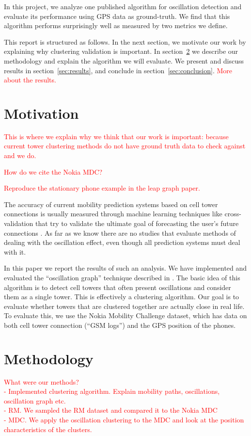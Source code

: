 \documentclass[letterpaper, 11pt, conference]{ieeeconf}
\newcommand{\xxx}[1]{\textcolor{red}{#1}}
\begin{document}
In this project, we analyze one published algorithm for oscillation detection \cite{mobilityprofiler} and evaluate its performance using GPS data as ground-truth. We find that this algorithm performs surprisingly well as measured by two metrics we define.

This report is structured as follows. In the next section, we motivate our work by explaining why clustering validation is important. In section~\ref{sec:methodology} we describe our methodology  and explain the algorithm we will evaluate. We present and discuss results in section~\ref{sec:results}, and conclude in section~\ref{sec:conclusion}.
\xxx{More about the results.}

\section{Motivation}

\xxx{This is where we explain why we think that our work is important: because current tower clustering methods do not have ground truth data to check against and we do.}

\xxx{How do we cite the Nokia MDC?}

\xxx{Reproduce the stationary phone example in the leap graph paper.}

The accuracy of current mobility prediction systems based on cell tower connections is usually measured through machine learning techniques like cross-validation that try to validate the ultimate goal of forecasting the user's future connections \cite{LeapGraph}. As far as we know there are no studies that evaluate methods of dealing with the oscillation effect, even though all prediction systems must deal with it.

In this paper we report the results of such an analysis. We have implemented and evaluated the ``oscillation graph'' technique described in \cite{mobilityprofiler}. The basic idea of this algorithm is to detect cell towers that often present oscillations and consider them as a single tower. This is effectively a clustering algorithm. Our goal is to evaluate whether towers that are clustered together are actually close in real life. To evaluate this, we use the Nokia Mobility Challenge dataset, which has data on both cell tower connection (``GSM logs'') and the GPS position of the phones.

\section{Methodology}
\label{sec:methodology}
\xxx{What were our methods?\\- Implemented clustering algorithm. Explain mobility paths, oscillations, oscillation graph etc. \\- RM. We sampled the RM dataset and compared it to
the Nokia MDC \\- MDC. We apply the oscillation clustering to the MDC and look at the position
characteristics of the clusters.}
\end{document}
